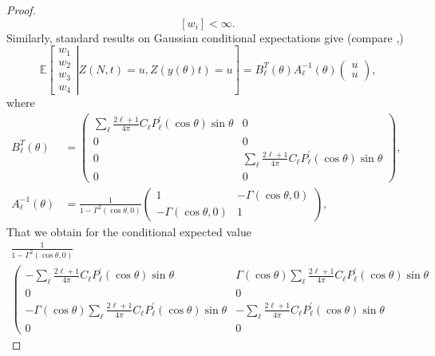 \documentclass[10pt]{amsart}
\theoremstyle{definition}\newtheorem{defi}[theo]{Definition}\newtheorem{rema}[theo]{Remark}\newtheorem{exam}[theo]{Example}\newtheorem{exem}[theo]{Example}\newtheorem{nota}[theo]{Notation}
\newcommand{\bbE}{\mathbb{E}}
\begin{document}
\begin{proof}
\begin{equation*}
\left[w_{i}\right] <\infty \text{.}
\end{equation*}
Similarly, standard results on Gaussian conditional expectations give (compare \cite[App\-endix A]{Wig},)
\begin{equation*}
\bbE\left[\left.
\begin{array}{c}
w_{1} \\
w_{2} \\
w_{3} \\
w_{4}
\end{array}
\right\vert Z(N,t)=u,Z(y(\theta)t)=u\right] =B_{\ell }^{T}(\theta)A_{\ell }^{-1}(\theta)\left(
\begin{array}{c}
u \\
u
\end{array}
\right) \text{,}
\end{equation*}
where
\begin{align*}
B_{\ell }^{T}(\theta) &=\left(
\begin{array}{cc}
\sum_{\ell }\frac{2\ell +1}{4\pi }C_{\ell }P_{\ell }^{\prime }(\cos \theta)\sin \theta & 0 \\
0 & 0 \\
0 & \sum_{\ell }\frac{2\ell +1}{4\pi }C_{\ell }P_{\ell }^{\prime }(\cos
\theta)\sin \theta \\
0 & 0
\end{array}
\right) \text{, } \\
A_{\ell }^{-1}(\theta) &=\frac{1}{1-\Gamma ^{2}(\cos \theta,0)}\left(
\begin{array}{cc}
1 & -\Gamma (\cos \theta,0) \\
-\Gamma (\cos \theta,0) & 1
\end{array}
\right) \text{,}
\end{align*}
That we obtain for the conditional expected value
\begin{multline*}
\frac{1}{1-\Gamma ^{2}(\cos \theta,0)}\\
\left(
\begin{array}{cc}
-\sum_{\ell }\frac{2\ell +1}{4\pi }C_{\ell }P_{\ell }^{\prime }(\cos \theta)\sin \theta & \Gamma (\cos \theta)\sum_{\ell }\frac{2\ell +1}{4\pi } C_{\ell }P_{\ell }^{\prime }(\cos \theta)\sin \theta \\
0 & 0 \\
-\Gamma (\cos \theta)\sum_{\ell }\frac{2\ell +1}{4\pi }C_{\ell }P_{\ell }^{\prime }(\cos \theta)\sin \theta & -\sum_{\ell }\frac{2\ell +1}{4\pi } C_{\ell }P_{\ell }^{\prime }(\cos \theta)\sin \theta \\
0 & 0
\end{array}

\end{multline*}
\end{proof}
\end{document}
